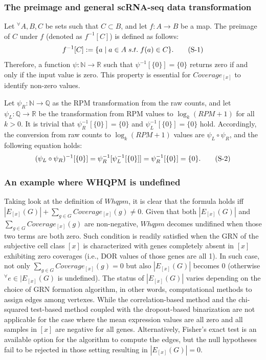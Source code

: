 \documentclass{article}
\begin{document}
\subsubsection*{
  The preimage and general scRNA-seq data transformation
}
Let $^\forall A,B,C$ be sets such that $C\subset B$, and let $f:A\rightarrow B$ be a map. 
The preimage of $C$ under $f$ (denoted as $f^{-1}[C]$) is defined as follows:
\begin{equation}\label{preimage}
  f^{-1}[C]:=\{a\;|\;a\in A\;s.t.\;f(a)\in C\}.
  \stepcounter{equation} \tag{S-\theequation}
\end{equation}
Therefore, a function $\psi: \mathbb{N}\rightarrow\mathbb{R}$ such that $\psi^{-1}[\{0\}]=\{0\}$ returns zero 
if and only if the input value is zero. This property is essential for $Coverage_{[x]}$ to identify non-zero values.

Let $\psi_R:\mathbb{N}\rightarrow \mathbb{Q}$ as the RPM transformation from the raw counts, and let $\psi_L:\mathbb{Q}\rightarrow \mathbb{R}$ be the transformation 
from RPM values to $\log_k(RPM+1)$ for all $k>0$. It is trivial that $\psi_R^{-1}[\{0\}]=\{0\}$ and $\psi_L^{-1}[\{0\}]=\{0\}$ hold.
Accordingly, the conversion from raw counts to $\log_k(RPM+1)$ values are $\psi_L\circ\psi_R$, and the following equation holds:
\begin{equation}\label{raw2logrpm}
  (\psi_L\circ\psi_R)^{-1}[\{0\}]=\psi_R^{-1}[\psi_L^{-1}[\{0\}]]=\psi_R^{-1}[\{0\}]=\{0\}.
  \stepcounter{equation} \tag{S-\theequation}
\end{equation}

\subsubsection*{
  An example where WHQPM is undefined
}
Taking look at the definition of $Whqpm$, it is clear that the formula holds iff $|E_{[x]}(G)|+\sum_{g\in G}Coverage_{[x]}(g)\neq 0$. 
Given that both $|E_{[x]}(G)|$ and $\sum_{g\in G}Coverage_{[x]}(g)$ are non-negative, $Whqpm$ decomes undifined when those two 
terms are both zero. Such condition is readily satisfied when the GRN of the subjective cell class $[x]$ is characterized 
with genes completely absent in $[x]$ exhibiting zero coverages (i.e., DOR values of those genes are all 1). In such 
case, not only $\sum_{g\in G}Coverage_{[x]}(g)=0$ but also $|E_{[x]}(G)|$ becomes 0 (otherwise $^\forall e\in|E_{[x]}(G)$ is undefined). The status 
of $|E_{[x]}(G)|$ varies depending on the choice of GRN formation algorithm, in other words, computational methods to 
assign edges among vertexes. While the correlation-based method and the chi-squared test-based method coupled 
with the dropout-based binarization are not applicable for the case where the mean expression values are all zero 
and all samples in $[x]$ are negative for all genes. Alternatively, Fisher's exact test is an available option for the 
algorithm to compute the edges, but the null hypotheses fail to be rejected in those setting resulting in $|E_{[x]}(G)|=0$.
\end{document}

